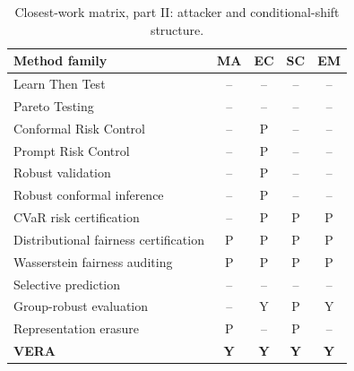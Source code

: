 \begin{table}[t]
\centering\scriptsize
\begin{tabular}{@{}lcccc@{}}
\toprule
Method family & MA & EC & SC & EM \\
\midrule
Learn Then Test \cite{angelopoulos2025ltt} & -- & -- & -- & -- \\
Pareto Testing \cite{laufer2023pareto} & -- & -- & -- & -- \\
Conformal Risk Control \cite{angelopoulos2024crc} & -- & P & -- & -- \\
Prompt Risk Control \cite{zollo2024prompt} & -- & P & -- & -- \\
Robust validation \cite{cauchois2024robust} & -- & P & -- & -- \\
Robust conformal inference \cite{ai2024finegrained} & -- & P & -- & -- \\
CVaR risk certification \cite{thomas2019cvar} & -- & P & P & P \\
Distributional fairness certification \cite{kang2022certifying} & P & P & P & P \\
Wasserstein fairness auditing \cite{ehyaei2025fragile} & P & P & P & P \\
Selective prediction \cite{elyaniv2010foundations,geifman2019selectivenet} & -- & -- & -- & -- \\
Group-robust evaluation \cite{sagawa2020groupdro,koh2021wilds} & -- & Y & P & Y \\
Representation erasure \cite{ravfogel2020null,ravfogel2022linear,belrose2023leace} & P & -- & P & -- \\
\textbf{VERA} & \textbf{Y} & \textbf{Y} & \textbf{Y} & \textbf{Y} \\
\bottomrule
\end{tabular}
\caption{Closest-work matrix, part II: attacker and conditional-shift structure.}
\label{tab:novelty-b}
\end{table}

